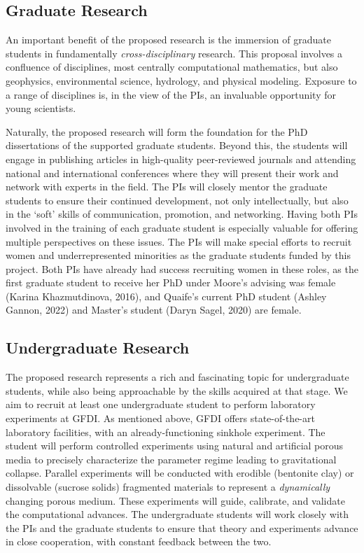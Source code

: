 \documentclass[11pt]{article}
\begin{document}
\subsection{Graduate Research}
An important benefit of the proposed research is the immersion of graduate students in fundamentally {\em cross-disciplinary} research. This proposal involves a confluence of disciplines, most centrally computational mathematics, but also geophysics, environmental science, hydrology, and physical modeling. Exposure to a range of disciplines is, in the view of the PIs, an invaluable opportunity for young scientists.  

Naturally, the proposed research will form the foundation for the PhD dissertations of the supported graduate students. Beyond this, the students will engage in publishing articles in high-quality peer-reviewed journals and attending national and international conferences where they will present their work and network with experts in the field. The PIs will closely mentor the graduate students to ensure their continued development, not only intellectually, but also in the `soft' skills of communication, promotion, and networking. Having both PIs involved in the training of each graduate student is especially valuable for offering multiple perspectives on these issues. The PIs will make special efforts to recruit women and underrepresented minorities as the graduate students funded by this project. Both PIs have already had success recruiting women in these roles, as the first graduate student to receive her PhD under Moore's advising was female (Karina Khazmutdinova, 2016), and Quaife's current PhD student (Ashley Gannon, 2022) and Master's student (Daryn Sagel, 2020) are female.


\subsection{Undergraduate Research}
The proposed research represents a rich and fascinating topic for undergraduate students, while also being approachable by the skills acquired at that stage. We aim to recruit at least one undergraduate student to perform laboratory experiments at GFDI. As mentioned above, GFDI offers state-of-the-art laboratory facilities, with an already-functioning sinkhole experiment. The student will perform controlled experiments using natural and artificial porous media to precisely characterize the parameter regime leading to gravitational collapse. Parallel experiments will be conducted with erodible (bentonite clay) or dissolvable (sucrose solids) fragmented materials to represent a {\em dynamically} changing porous medium. These experiments will guide, calibrate, and validate the computational advances. The undergraduate students will work closely with the PIs and the graduate students to ensure that theory and experiments advance in close cooperation, with constant feedback between the two.
\end{document}
